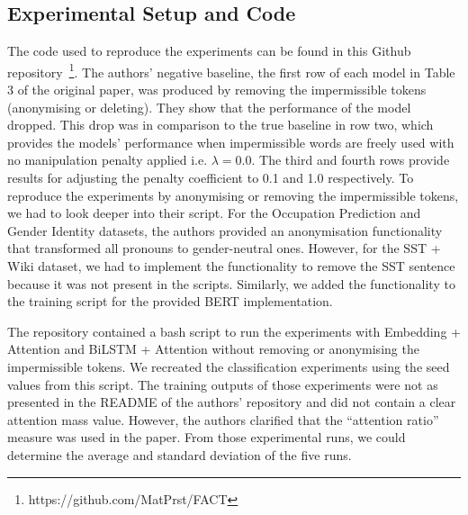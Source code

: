 
\subsection{Experimental Setup and Code}
The code used to reproduce the experiments can be found in this Github repository~\footnote{https://github.com/MatPrst/FACT}. The authors' negative baseline, the first row of each model in Table 3 of the original paper, was produced by removing the impermissible tokens (anonymising or deleting). They show that the performance of the model dropped. This drop was in comparison to the true baseline in row two, which provides the models' performance when impermissible words are freely used with no manipulation penalty applied i.e. $\lambda=0.0$. The third and fourth rows provide results for adjusting the penalty coefficient to 0.1 and 1.0 respectively. To reproduce the experiments by anonymising or removing the impermissible tokens, we had to look deeper into their script. For the Occupation Prediction and Gender Identity datasets, the authors provided an anonymisation functionality that transformed all pronouns to gender-neutral ones. However, for the SST + Wiki dataset, we had to implement the functionality to remove the SST sentence because it was not present in the scripts. Similarly, we added the functionality to the training script for the provided BERT implementation.

The repository contained a bash script to run the experiments with Embedding + Attention and BiLSTM + Attention without removing or anonymising the impermissible tokens. We recreated the classification experiments using the seed values from this script. The training outputs of those experiments were not as presented in the README of the authors' repository and did not contain a clear attention mass value. However, the authors clarified that the ``attention ratio'' measure was used in the paper. From those experimental runs, we could determine the average and standard deviation of the five runs.

